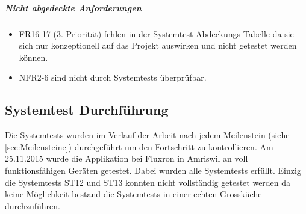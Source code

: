 \subparagraph{Nicht abgedeckte Anforderungen}
\begin{itemize}
\item \ac{FR}16-17 (3. Priorität) fehlen in der Systemtest Abdeckungs Tabelle da sie sich nur konzeptionell auf das Projekt auswirken und nicht getestet werden können.
\item \ac{NFR}2-6 sind nicht durch Systemtests überprüfbar.
\end{itemize}

\subsection{Systemtest Durchführung}
\label{sub:systemtest_durchfuehrung}

Die Systemtests wurden im Verlauf der Arbeit nach jedem Meilenstein (siehe \ref{sec:Meilensteine}) durchgeführt um den Fortschritt zu kontrollieren. Am 25.11.2015 wurde die Applikation bei Fluxron in Amriswil an voll funktionsfähigen Geräten getestet. Dabei wurden alle Systemtests erfüllt. Einzig die Systemtests ST12 und ST13 konnten nicht vollständig getestet werden da keine Möglichkeit bestand die Systemtests in einer echten Grossküche durchzuführen.

